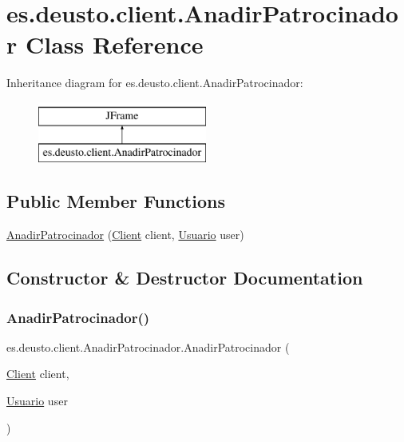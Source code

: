 \hypertarget{classes_1_1deusto_1_1client_1_1_anadir_patrocinador}{}\section{es.\+deusto.\+client.\+Anadir\+Patrocinador Class Reference}
\label{classes_1_1deusto_1_1client_1_1_anadir_patrocinador}
Inheritance diagram for es.\+deusto.\+client.\+Anadir\+Patrocinador\+:\begin{figure}[H]
\begin{center}
\leavevmode
\includegraphics[height=2.000000cm]{classes_1_1deusto_1_1client_1_1_anadir_patrocinador}
\end{center}
\end{figure}
\subsection*{Public Member Functions}
\begin{DoxyCompactItemize}
\item 
\mbox{\hyperlink{classes_1_1deusto_1_1client_1_1_anadir_patrocinador_a3735933a23df8aedc65cf1916c85f660}{Anadir\+Patrocinador}} (\mbox{\hyperlink{classes_1_1deusto_1_1client_1_1_client}{Client}} client, \mbox{\hyperlink{classes_1_1deusto_1_1server_1_1jdo_1_1_usuario}{Usuario}} user)
\end{DoxyCompactItemize}


\subsection{Constructor \& Destructor Documentation}
\mbox{\label{classes_1_1deusto_1_1client_1_1_anadir_patrocinador_a3735933a23df8aedc65cf1916c85f660}} 
\subsubsection{\texorpdfstring{AnadirPatrocinador()}{AnadirPatrocinador()}}
{\footnotesize\ttfamily es.\+deusto.\+client.\+Anadir\+Patrocinador.\+Anadir\+Patrocinador (\begin{DoxyParamCaption}\item[{\mbox{\hyperlink{classes_1_1deusto_1_1client_1_1_client}{Client}}}]{client,  }\item[{\mbox{\hyperlink{classes_1_1deusto_1_1server_1_1jdo_1_1_usuario}{Usuario}}}]{user }\end{DoxyParamCaption})}


